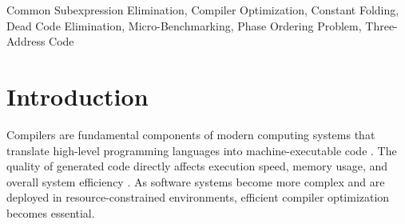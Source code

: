\documentclass[conference]{IEEEtran}
\begin{document}
\maketitle

\begin{abstract}
The phase ordering problem remains a fundamental challenge in compiler optimization, where the sequence of applying optimization passes significantly affects the final program performance and code size. This project presents an empirical analysis of optimization phase ordering trade-offs using a custom-built compiler infrastructure. The compiler is designed with a handwritten lexical analyzer, a recursive-descent parser, and a Three-Address Code (3AC) intermediate representation to enable controlled experimentation. Key optimization techniques, including Constant Folding, Dead Code Elimination, and Common Subexpression Elimination, are implemented as independent and reorderable passes using a configurable pass manager. Micro-benchmark programs adapted from standard benchmark suites are used to evaluate different optimization sequences. The study measures performance using instruction count and estimated execution cycles to analyze the trade-offs between execution speed and code density. The results provide insights into how specific ordering of optimization phases can either enhance or diminish optimization effectiveness, thereby contributing to improved understanding and design of efficient compiler pipelines, particularly for small-scale and educational compiler systems.
\end{abstract}

\begin{IEEEkeywords}
Common Subexpression Elimination,
Compiler Optimization,
Constant Folding,
Dead Code Elimination,
Micro-Benchmarking,
Phase Ordering Problem,
Three-Address Code
\end{IEEEkeywords}

\section{Introduction}

Compilers are fundamental components of modern computing systems that translate high-level programming languages into machine-executable code \cite{ref21}. The quality of generated code directly affects execution speed, memory usage, and overall system efficiency \cite{ref18}. As software systems become more complex and are deployed in resource-constrained environments, efficient compiler optimization becomes essential.
\end{document}
